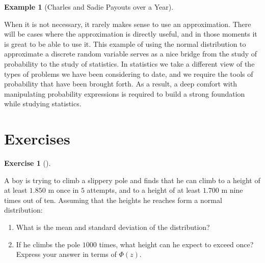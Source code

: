 \documentclass[
  letterpaper,
  DIV=11,
  numbers=noendperiod]{scrreprt}
\providecommand{\tightlist}{%
  \setlength{\itemsep}{0pt}\setlength{\parskip}{0pt}}\usepackage{longtable,booktabs,array}
\theoremstyle{definition}
\newtheorem{exercise}{Exercise}[chapter]
\theoremstyle{definition}
\newtheorem{example}{Example}[chapter]
\theoremstyle{definition}
\theoremstyle{remark}
\begin{document}
\begin{example}[Charles and Sadie Payouts over a
Year]
\begin{tcolorbox}[enhanced jigsaw, colback=white, colframe=quarto-callout-color-frame, arc=.35mm, leftrule=.75mm, rightrule=.15mm, opacityback=0, breakable, bottomrule=.15mm, left=2mm, toprule=.15mm]
\end{tcolorbox}




\end{example}

When it is not necessary, it rarely makes sense to use an approximation.
There will be cases where the approximation is directly useful, and in
those moments it is great to be able to use it. This example of using
the normal distribution to approximate a discrete random variable serves
as a nice bridge from the study of probability to the study of
statistics. In statistics we take a different view of the types of
problems we have been considering to date, and we require the tools of
probability that have been brought forth. As a result, a deep comfort
with manipulating probability expressions is required to build a strong
foundation while studying statistics.

\section*{Exercises}\label{exercises-7}


\begin{exercise}[]\protect\hypertarget{exr-9.1}{}\label{exr-9.1}

A boy is trying to climb a slippery pole and finds that he can climb to
a height of at least \(1.850\) m once in \(5\) attempts, and to a height
of at least \(1.700\) m nine times out of ten. Assuming that the heights
he reaches form a normal distribution:

\begin{enumerate}
\def\labelenumi{\alph{enumi}.}
\tightlist
\item
  What is the mean and standard deviation of the distribution?
\item
  If he climbs the pole \(1000\) times, what height can he expect to
  exceed once? Express your answer in terms of \(\Phi(z)\).
\end{enumerate}

\end{exercise}
\end{document}
